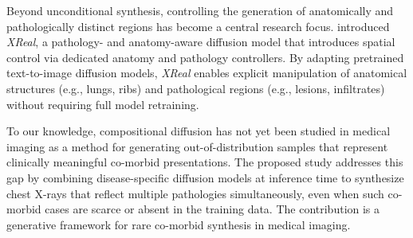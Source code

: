 Beyond unconditional synthesis, controlling the generation of anatomically and pathologically distinct regions has become a central research focus. 
\citet{hashmi2024xreal} introduced \textit{XReal}, a pathology- and anatomy-aware diffusion model that introduces spatial control via dedicated anatomy and pathology controllers. 
By adapting pretrained text-to-image diffusion models, \textit{XReal} enables explicit manipulation of anatomical structures (e.g., lungs, ribs) and pathological regions (e.g., lesions, infiltrates) without requiring full model retraining. 

To our knowledge, compositional diffusion has not yet been studied in medical imaging as a method for generating out-of-distribution samples that represent clinically meaningful co-morbid presentations. 
The proposed study addresses this gap by combining disease-specific diffusion models at inference time to synthesize chest X-rays that reflect multiple pathologies simultaneously, even when such co-morbid cases are scarce or absent in the training data. 
The contribution is a generative framework for rare co-morbid synthesis in medical imaging.

